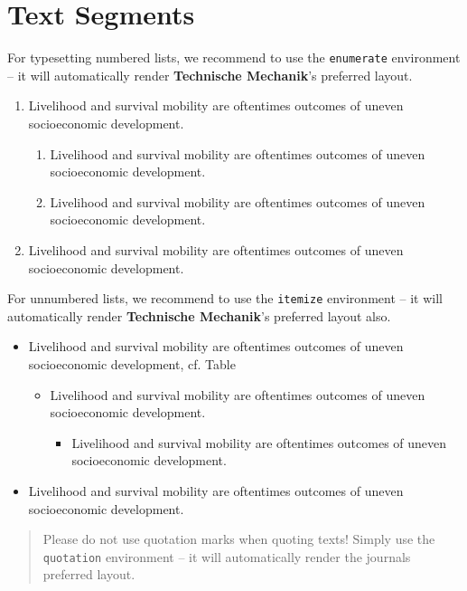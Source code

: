 \documentclass{techmech}
\begin{document}
\section{Text Segments}
For typesetting numbered lists, we recommend to use the \verb|enumerate| environment -- it will automatically render \textsf{\bfseries Technische Mechanik}'s preferred layout.
\begin{enumerate}
\item{Livelihood and survival mobility are oftentimes outcomes of uneven socioeconomic development.}
\begin{enumerate}
\item{Livelihood and survival mobility are oftentimes outcomes of uneven socioeconomic development.}
\item{Livelihood and survival mobility are oftentimes outcomes of uneven socioeconomic development.}
\end{enumerate}
\item{Livelihood and survival mobility are oftentimes outcomes of uneven socioeconomic development.}
\end{enumerate}
For unnumbered lists, we recommend to use the \verb|itemize| environment -- it will automatically render \textsf{\bfseries Technische Mechanik}'s preferred layout also.
\begin{itemize}
\item{Livelihood and survival mobility are oftentimes outcomes of uneven socioeconomic development, cf. Table%
}
\begin{itemize}
\item{Livelihood and survival mobility are oftentimes outcomes of uneven socioeconomic development.}
\begin{itemize}
\item{Livelihood and survival mobility are oftentimes outcomes of uneven socioeconomic development.}
\end{itemize}
\end{itemize}
\item{Livelihood and survival mobility are oftentimes outcomes of uneven socioeconomic development.}
\end{itemize}
\begin{quotation}
Please do not use quotation marks when quoting texts! Simply use the \verb|quotation| environment -- it will automatically render the journals preferred layout.
\end{quotation}
\end{document}

